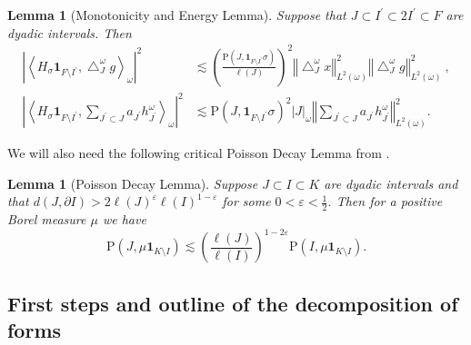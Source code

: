 \documentclass{amsart}%
\theoremstyle{plain}
\newtheorem{lemma}[theorem]{Lemma}
\numberwithin{equation}{section}
\begin{document}
\begin{lemma}
[Monotonicity and Energy Lemma]\label{Energy Lemma}Suppose that $J\subset
I^{\prime}\subset2I^{\prime}\subset F$ are dyadic intervals. Then
\begin{align*}
\left\vert \left\langle H_{\sigma}\mathbf{1}_{F\setminus I^{\prime}%
},\bigtriangleup_{J}^{\omega}g\right\rangle _{\omega}\right\vert ^{2}  &
\lesssim\left(  \frac{\mathrm{P}\left(  J,\mathbf{1}_{F\setminus I^{\prime}%
}\sigma\right)  }{\ell\left(  J\right)  }\right)  ^{2}\left\Vert
\bigtriangleup_{J}^{\omega}x\right\Vert _{L^{2}\left(  \omega\right)  }%
^{2}\left\Vert \bigtriangleup_{J}^{\omega}g\right\Vert _{L^{2}\left(
\omega\right)  }^{2}\ ,\\
\left\vert \left\langle H_{\sigma}\mathbf{1}_{F\setminus I^{\prime}}%
,\sum_{J^{\prime}\subset J}a_{J^{\prime}}h_{J^{\prime}}^{\omega}\right\rangle
_{\omega}\right\vert ^{2}  & \lesssim\mathrm{P}\left(  J,\mathbf{1}%
_{F\setminus I^{\prime}}\sigma\right)  ^{2}\left\vert J\right\vert _{\omega
}\left\Vert \sum_{J^{\prime}\subset J}a_{J^{\prime}}h_{J^{\prime}}^{\omega
}\right\Vert _{L^{2}\left(  \omega\right)  }^{2}.
\end{align*}

\end{lemma}

We will also need the following critical Poisson Decay Lemma from \cite{Vol}.

\begin{lemma}
[Poisson Decay Lemma]\label{Poisson inequality}Suppose $J\subset I\subset K$
are dyadic intervals and that $d\left(  J,\partial I\right)  >2\ell\left(
J\right)  ^{\varepsilon}\ell\left(  I\right)  ^{1-\varepsilon}$ for some
$0<\varepsilon<\frac{1}{2} $. Then for a positive Borel measure $\mu$ we have%
\begin{equation}
\mathrm{P}(J,\mu\mathbf{1}_{K\setminus I})\lesssim\left(  \frac{\ell\left(
J\right)  }{\ell\left(  I\right)  }\right)  ^{1-2\varepsilon}\mathrm{P}%
(I,\mu\mathbf{1}_{K\setminus I}).\label{e.Jsimeq}%
\end{equation}

\end{lemma}

\subsection{First steps and outline of the decomposition of forms}
\end{document}
